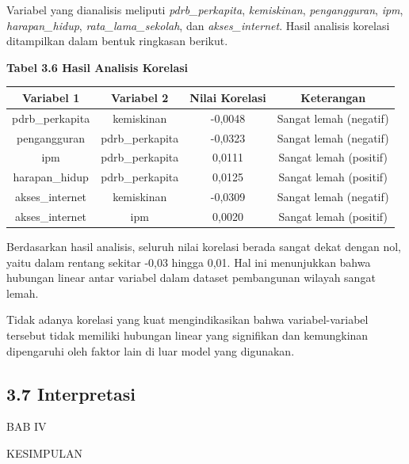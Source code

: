 \documentclass[
  12pt,
]{article}
\begin{document}
Variabel yang dianalisis meliputi \textit{pdrb\_perkapita},
\textit{kemiskinan}, \textit{pengangguran}, \textit{ipm},
\textit{harapan\_hidup}, \textit{rata\_lama\_sekolah}, dan
\textit{akses\_internet}. Hasil analisis korelasi ditampilkan dalam
bentuk ringkasan berikut.

\begin{center}
  \textbf{Tabel 3.6 Hasil Analisis Korelasi}
  
  \begin{tabular}{|c|c|c|c|}
  \hline
  \textbf{Variabel 1} & \textbf{Variabel 2} & \textbf{Nilai Korelasi} & \textbf{Keterangan} \\
  \hline
  pdrb\_perkapita & kemiskinan & -0,0048 & Sangat lemah (negatif) \\
  \hline
  pengangguran & pdrb\_perkapita & -0,0323 & Sangat lemah (negatif) \\
  \hline
  ipm & pdrb\_perkapita & 0,0111 & Sangat lemah (positif) \\
  \hline
  harapan\_hidup & pdrb\_perkapita & 0,0125 & Sangat lemah (positif) \\
  \hline
  akses\_internet & kemiskinan & -0,0309 & Sangat lemah (negatif) \\
  \hline
  akses\_internet & ipm & 0,0020 & Sangat lemah (positif) \\
  \hline
  \end{tabular}
\end{center}

Berdasarkan hasil analisis, seluruh nilai korelasi berada sangat dekat
dengan nol, yaitu dalam rentang sekitar -0,03 hingga 0,01. Hal ini
menunjukkan bahwa hubungan linear antar variabel dalam dataset
pembangunan wilayah sangat lemah.

Tidak adanya korelasi yang kuat mengindikasikan bahwa variabel-variabel
tersebut tidak memiliki hubungan linear yang signifikan dan kemungkinan
dipengaruhi oleh faktor lain di luar model yang digunakan.

\subsection{\texorpdfstring{\normalsize 3.7 \hspace {0,5cm}
Interpretasi}{3.7  Interpretasi}}\label{interpretasi}

\setcounter{page}{3}

\newpage

\begin{center}
  {
    \bfseries
    
    \vfill
    
    \Large
    
    BAB IV
    
    KESIMPULAN
  }
\end{center}
\end{document}
